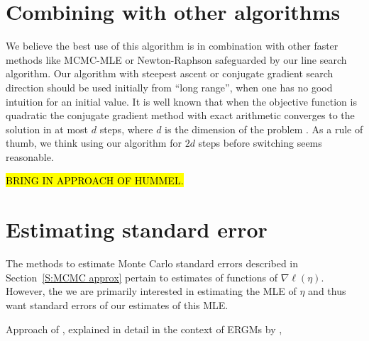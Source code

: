 \section{Combining with other algorithms} \label{S:Combine}
We believe the best use of this algorithm is in combination with other faster methods 
like MCMC-MLE \citep{Geyer:1992}
or Newton-Raphson safeguarded by our line search algorithm.  Our algorithm with 
steepest ascent or conjugate gradient search direction
should be used initially from ``long range'', when one has no good intuition for an 
initial value.
It is well known that when the objective function is quadratic the conjugate gradient 
method with exact arithmetic converges to the solution
in at most $d$ steps, where $d$ is the dimension of the problem \citep{NW}.  As a rule 
of thumb, we think using our 
algorithm for $2d$ steps before switching seems reasonable.

\hl{BRING IN APPROACH OF HUMMEL.}

\section{Estimating standard error} \label{S:SE}
The methods to estimate Monte Carlo standard errors described in 
Section~\ref{S:MCMC approx} pertain to estimates of functions of $\nabla \ell(\eta)$.
However, the we are primarily interested in estimating the MLE of $\eta$ and thus
want standard errors of our estimates of this MLE.

Approach of \citet{Geyer:1994}, explained in detail in the context of ERGMs by \citet{Hunter:2006},
